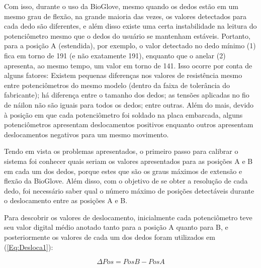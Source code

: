 \documentclass[
	12pt,				%
	openright,			%
	oneside,			%
	a4paper,			%
	english,			%
	brazil				%
	]{abntex2}
\begin{document}
		Com isso, durante o uso da BioGlove, mesmo quando os dedos estão em um mesmo grau de flexão, na grande maioria das vezes, os valores detectados para cada dedo são diferentes, e além disso existe uma certa instabilidade na leitura do potenciômetro mesmo que o dedos do usuário se mantenham estáveis. Portanto, para a posição A (estendida), por exemplo, o valor detectado no dedo mínimo (1) fica em torno de 191 (e não exatamente 191), enquanto que o anelar (2) apresenta, ao mesmo tempo, um valor em torno de 141. Isso ocorre por conta de alguns fatores: Existem pequenas diferenças nos valores de resistência mesmo entre potenciômetros do mesmo modelo (dentro da faixa de tolerância do fabricante); há diferença entre o tamanho dos dedos; as tensões aplicadas no fio de náilon não são iguais para todos os dedos; entre outras. Além do mais, devido à posição em que cada potenciômetro foi soldado na placa embarcada, alguns potenciômetros apresentam deslocamentos positivos enquanto outros apresentam deslocamentos negativos para um mesmo movimento.


		

		Tendo em vista os problemas apresentados, o primeiro passo para calibrar o sistema foi conhecer quais seriam os valores apresentados para as posições A e B em cada um dos dedos, porque estes que são os graus máximos de extensão e flexão da BioGlove. Além disso, com o objetivo de se obter a resolução de cada dedo, foi necessário saber qual o número máximo de posições detectáveis durante o deslocamento entre as posições A e B.

		Para descobrir os valores de deslocamento, inicialmente cada potenciômetro teve seu valor digital médio anotado tanto para a posição A quanto para B, e posteriormente os valores de cada um dos dedos foram utilizados em (\ref{Eq:Desloca1}):

	\begin{equation}
			\Delta Pos 	= Pos B 	- 	Pos A
		\label{Eq:Desloca1}
	\end{equation}
\end{document}
